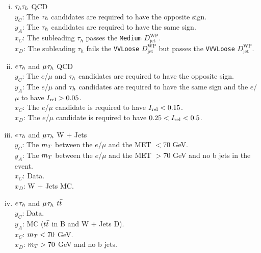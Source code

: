 \begin{enumerate}[i)]
   \item $\tau_{h}\tau_{h}$ \ac{QCD} \\
     \indent $y_C$: The $\tau_{h}$ candidates are required to have the opposite sign. \\
     \indent $y_A$: The $\tau_{h}$ candidates are required to have the same sign. \\
     \indent $x_C$: The subleading $\tau_h$ passes the \texttt{Medium} $D_{\text{jet}}^{\text{WP}}$. \\
     \indent $x_D$: The subleading $\tau_h$ fails the \texttt{VVLoose} $D_{\text{jet}}^{\text{WP}}$ but passes the \texttt{VVVLoose} $D_{\text{jet}}^{\text{WP}}$.
  \item $e_{}\tau_{h}$ and $\mu_{}\tau_{h}$ \ac{QCD} \\
    \indent $y_C$: The $e$/$\mu$ and $\tau_{h}$ candidates are required to have the opposite sign. \\
    \indent $y_A$: The $e$/$\mu$ and $\tau_{h}$ candidates are required to have the same sign and the $e$/$\mu$ to have $I_{\text{rel}}>0.05$. \\
    \indent $x_C$: The $e$/$\mu$ candidate is required to have $I_{\text{rel}}<0.15$. \\
    \indent $x_D$: The $e$/$\mu$ candidate is required to have $0.25<I_{\text{rel}}<0.5$.
  \item $e_{}\tau_{h}$ and $\mu_{}\tau_{h}$ W + Jets \\
    \indent $y_C$: The $m_{T}$ between the $e$/$\mu$ and the \ac{MET} $< 70$ GeV. \\
    \indent $y_A$: The $m_{T}$ between the $e$/$\mu$ and the \ac{MET} $> 70$ GeV and no b jets in the event. \\
    \indent $x_C$: Data. \\
    \indent $x_D$: W + Jets \ac{MC}.
  \item $e_{}\tau_{h}$ and $\mu_{}\tau_{h}$ $t\bar{t}$ \\
    \indent $y_C$: Data. \\
    \indent $y_A$: \ac{MC} ($t\bar{t}$ in B and W + Jets D). \\
    \indent $x_C$: $m_{T} < 70$ GeV. \\
    \indent $x_D$: $m_{T} > 70$ GeV and no b jets. \\
\end{enumerate}

